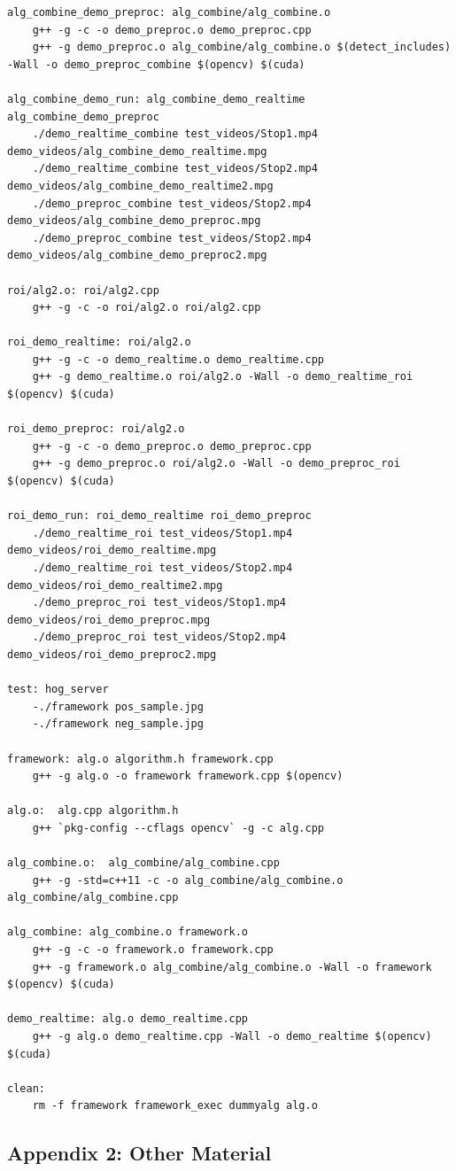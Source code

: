 \documentclass[letterpaper,10pt,titlepage]{article}
\begin{document}
\begin{lstlisting}
alg_combine_demo_preproc: alg_combine/alg_combine.o
	g++ -g -c -o demo_preproc.o demo_preproc.cpp
	g++ -g demo_preproc.o alg_combine/alg_combine.o $(detect_includes) -Wall -o demo_preproc_combine $(opencv) $(cuda)

alg_combine_demo_run: alg_combine_demo_realtime alg_combine_demo_preproc 
	./demo_realtime_combine test_videos/Stop1.mp4 demo_videos/alg_combine_demo_realtime.mpg 
	./demo_realtime_combine test_videos/Stop2.mp4 demo_videos/alg_combine_demo_realtime2.mpg 
	./demo_preproc_combine test_videos/Stop2.mp4 demo_videos/alg_combine_demo_preproc.mpg 
	./demo_preproc_combine test_videos/Stop2.mp4 demo_videos/alg_combine_demo_preproc2.mpg 

roi/alg2.o: roi/alg2.cpp
	g++ -g -c -o roi/alg2.o roi/alg2.cpp

roi_demo_realtime: roi/alg2.o
	g++ -g -c -o demo_realtime.o demo_realtime.cpp
	g++ -g demo_realtime.o roi/alg2.o -Wall -o demo_realtime_roi $(opencv) $(cuda)

roi_demo_preproc: roi/alg2.o
	g++ -g -c -o demo_preproc.o demo_preproc.cpp
	g++ -g demo_preproc.o roi/alg2.o -Wall -o demo_preproc_roi $(opencv) $(cuda)

roi_demo_run: roi_demo_realtime roi_demo_preproc 
	./demo_realtime_roi test_videos/Stop1.mp4 demo_videos/roi_demo_realtime.mpg 
	./demo_realtime_roi test_videos/Stop2.mp4 demo_videos/roi_demo_realtime2.mpg 
	./demo_preproc_roi test_videos/Stop1.mp4 demo_videos/roi_demo_preproc.mpg 
	./demo_preproc_roi test_videos/Stop2.mp4 demo_videos/roi_demo_preproc2.mpg 

test: hog_server
	-./framework pos_sample.jpg 
	-./framework neg_sample.jpg

framework: alg.o algorithm.h framework.cpp 
	g++ -g alg.o -o framework framework.cpp $(opencv)

alg.o:	alg.cpp algorithm.h
	g++ `pkg-config --cflags opencv` -g -c alg.cpp  

alg_combine.o:	alg_combine/alg_combine.cpp 
	g++ -g -std=c++11 -c -o alg_combine/alg_combine.o alg_combine/alg_combine.cpp

alg_combine: alg_combine.o framework.o
	g++ -g -c -o framework.o framework.cpp
	g++ -g framework.o alg_combine/alg_combine.o -Wall -o framework $(opencv) $(cuda)

demo_realtime: alg.o demo_realtime.cpp
	g++ -g alg.o demo_realtime.cpp -Wall -o demo_realtime $(opencv) $(cuda)

clean:
	rm -f framework framework_exec dummyalg alg.o

\end{lstlisting}
\newpage

\vspace*{\fill}
\begin{center}
\begin{minipage}{.6\textwidth}
\section*{Appendix 2: Other Material}
\end{minipage}
\end{center}
\vfill

\newpage
\end{document}
